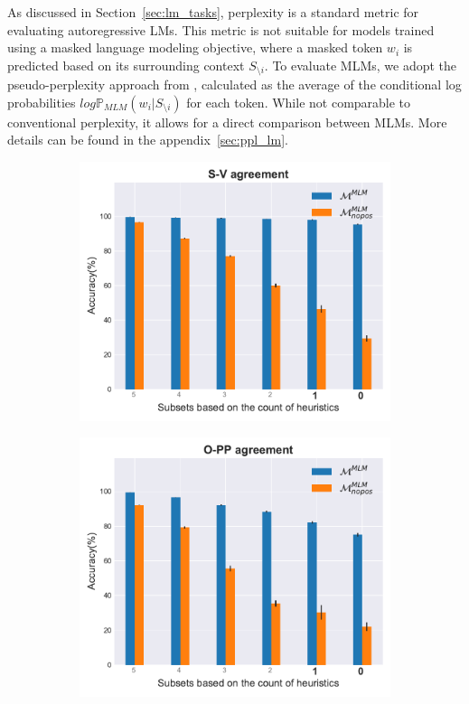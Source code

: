 As discussed in Section~\ref{sec:lm_tasks}, perplexity is a standard metric for evaluating autoregressive LMs. This metric is not suitable for models trained using a masked language modeling objective, where a masked token $w_i$ is predicted based on its surrounding context $S_{ \setminus i}$. To evaluate MLMs, we adopt the pseudo-perplexity approach from \cite{salazar-etal-2020-masked}, calculated as the average of the conditional log probabilities $log \mathbb{P}_{MLM}(w_i | S_{ \setminus i})$ for each token. While not comparable to conventional perplexity, it allows for a direct comparison between MLMs. More details can be found in the appendix~\ref{sec:ppl_lm}. 

\begin{figure}[ht]
    \centering
    \begin{subfigure}[b]{0.49\textwidth}
        \includegraphics[width=\textwidth]{figures/mlm-nopos-subj-v.pdf}
    \end{subfigure}
    \hfill
    \begin{subfigure}[b]{0.49\textwidth}
        \includegraphics[width=\textwidth]{figures/mlm-nopos-o-pp.pdf}

\end{subfigure}
\end{figure}
